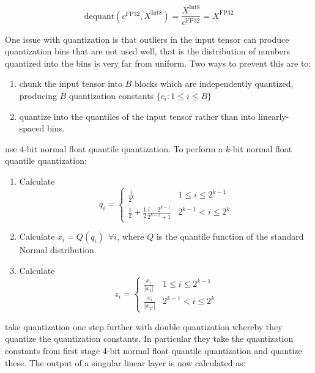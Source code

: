 \documentclass[11pt]{article}
\theoremstyle{definition}
\begin{document}
\begin{equation}
\mathrm{dequant} \left( c^{\mathrm{FP32}} , X^{\mathrm{Int8}} \right) = \frac{X^{\mathrm{Int8}}}{c^{\mathrm{FP32}}} = X^{\mathrm{FP32}}
\end{equation}

One issue with quantization is that outliers in the input tensor can produce quantization bins that are not used well, that is the distribution of numbers quantized into the bins is very far from uniform. Two ways to prevent this are to:
\begin{enumerate}
\item chunk the input tensor into $B$ blocks which are independently quantized, producing $B$ quantization constants $\{c_i : 1 \leq i \leq B \}$ 
\item quantize into the quantiles of the input tensor rather than into linearly-spaced bins.
\end{enumerate}

\cite{dettmers2023qlora} use 4-bit normal float quantile quantization. To perform a $k$-bit normal float quantile quantization:
\begin{enumerate}
 \item Calculate \begin{equation}
 q_i = \begin{cases}
 \frac{i}{2^k} & 1 \leq i \leq 2^{k-1} \\
 \frac{1}{2} + \frac{1}{2} \frac{i - 2^{k-1}}{2^{k-1}+1} & 2^{k-1} < i \leq 2^k
 \end{cases}
 \end{equation}
 \item Calculate $x_i = Q(q_i) \ \ \forall i$, where $Q$ is the quantile function of the standard Normal distribution. 
 \item Calculate \begin{equation}
 z_i = \begin{cases}
 \frac{x_i}{|x_1|} & 1 \leq i \leq 2^{k-1} \\
 \frac{x_i}{|x_{2^k}|} & 2^{k-1} < i \leq 2^k
 \end{cases}
 \end{equation}
\end{enumerate}

\cite{dettmers2023qlora} take quantization one step further with double quantization whereby they quantize the quantization constants. In particular they take the quantization constants from first stage 4-bit normal float quantile quantization and quantize these. The output of a singular linear layer is now calculated as:
\end{document}
